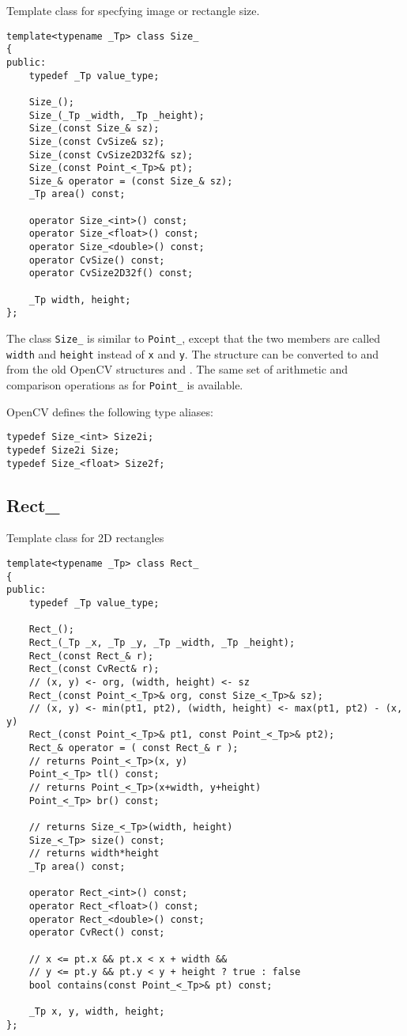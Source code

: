 Template class for specfying image or rectangle size.

\begin{lstlisting}
template<typename _Tp> class Size_
{
public:
    typedef _Tp value_type;
    
    Size_();
    Size_(_Tp _width, _Tp _height);
    Size_(const Size_& sz);
    Size_(const CvSize& sz);
    Size_(const CvSize2D32f& sz);
    Size_(const Point_<_Tp>& pt);
    Size_& operator = (const Size_& sz);
    _Tp area() const;

    operator Size_<int>() const;
    operator Size_<float>() const;
    operator Size_<double>() const;
    operator CvSize() const;
    operator CvSize2D32f() const;

    _Tp width, height;
};
\end{lstlisting}

The class \texttt{Size\_} is similar to \texttt{Point\_}, except that the two members are called \texttt{width} and \texttt{height} instead of \texttt{x} and \texttt{y}. The structure can be converted to and from the old OpenCV structures  and . The same set of arithmetic and comparison operations as for \texttt{Point\_} is available. 

OpenCV defines the following type aliases:

\begin{lstlisting}
typedef Size_<int> Size2i;
typedef Size2i Size;
typedef Size_<float> Size2f;
\end{lstlisting}

\subsection{Rect\_}

Template class for 2D rectangles

\begin{lstlisting}
template<typename _Tp> class Rect_
{
public:
    typedef _Tp value_type;
    
    Rect_();
    Rect_(_Tp _x, _Tp _y, _Tp _width, _Tp _height);
    Rect_(const Rect_& r);
    Rect_(const CvRect& r);
    // (x, y) <- org, (width, height) <- sz
    Rect_(const Point_<_Tp>& org, const Size_<_Tp>& sz);
    // (x, y) <- min(pt1, pt2), (width, height) <- max(pt1, pt2) - (x, y)
    Rect_(const Point_<_Tp>& pt1, const Point_<_Tp>& pt2);
    Rect_& operator = ( const Rect_& r );
    // returns Point_<_Tp>(x, y)
    Point_<_Tp> tl() const;
    // returns Point_<_Tp>(x+width, y+height)
    Point_<_Tp> br() const;
    
    // returns Size_<_Tp>(width, height)
    Size_<_Tp> size() const;
    // returns width*height
    _Tp area() const;

    operator Rect_<int>() const;
    operator Rect_<float>() const;
    operator Rect_<double>() const;
    operator CvRect() const;

    // x <= pt.x && pt.x < x + width &&
    // y <= pt.y && pt.y < y + height ? true : false
    bool contains(const Point_<_Tp>& pt) const;

    _Tp x, y, width, height;
};
\end{lstlisting}

